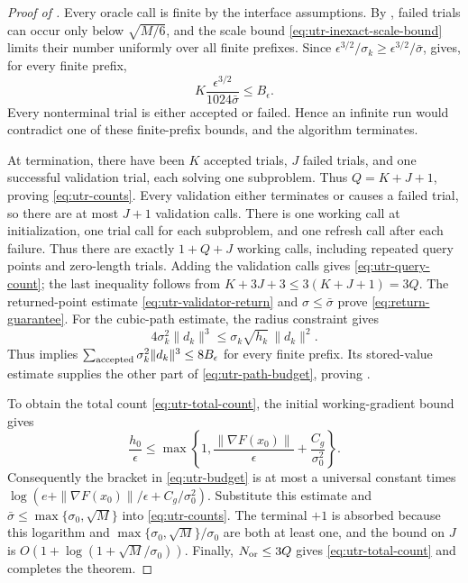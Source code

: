 \documentclass{article}
\begin{document}
\begin{proof}[Proof of ]
Every oracle call is finite by the interface assumptions.  By
, failed trials can occur only below
$\sqrt{M/6}$, and the scale bound
\eqref{eq:utr-inexact-scale-bound} limits their number uniformly
over all finite prefixes.  Since
$\epsilon^{3/2}/\sigma_k\ge\epsilon^{3/2}/\bar\sigma$,
gives, for every finite prefix,
\[
 K\frac{\epsilon^{3/2}}{1024\bar\sigma}\le B_\epsilon.
\]
Every nonterminal trial is either accepted or failed.  Hence an
infinite run would contradict one of these finite-prefix bounds,
and the algorithm terminates.

At termination, there have been $K$ accepted trials, $J$ failed
trials, and one successful validation trial, each solving one
subproblem.  Thus $Q=K+J+1$, proving \eqref{eq:utr-counts}.
Every validation either terminates or causes a failed trial, so
there are at most $J+1$ validation calls.
There is one working call at initialization, one trial call for each
subproblem, and one refresh call after each failure.  Thus there are
exactly $1+Q+J$ working calls, including repeated query points and
zero-length trials.  Adding the validation calls gives
\eqref{eq:utr-query-count}; the last inequality follows from
$K+3J+3\le3(K+J+1)=3Q$.
The returned-point estimate \eqref{eq:utr-validator-return} and
$\sigma\le\bar\sigma$ prove \eqref{eq:return-guarantee}.
For the cubic-path estimate, the radius constraint gives
\[
 4\sigma_k^2\|d_k\|^3
 \le\sigma_k\sqrt{h_k}\,\|d_k\|^2.
\]
Thus  implies
$\sum_{\rm accepted}\sigma_k^2\|d_k\|^3\le8B_\epsilon$ for every
finite prefix.  Its stored-value estimate supplies the other part
of \eqref{eq:utr-path-budget}, proving .

To obtain the total count \eqref{eq:utr-total-count}, the initial
working-gradient bound gives
\[
 \frac{h_0}{\epsilon}
 \le\max\left\{1,
       \frac{\|\nabla F(x_0)\|}{\epsilon}
          +\frac{C_g}{\sigma_0^2}\right\}.
\]
Consequently the bracket in \eqref{eq:utr-budget} is at most a
universal constant times
$\log(e+\|\nabla F(x_0)\|/\epsilon+C_g/\sigma_0^2)$.
Substitute this estimate and
$\bar\sigma\le\max\{\sigma_0,\sqrt M\}$ into
\eqref{eq:utr-counts}.  The terminal $+1$ is absorbed because this
logarithm and $\max\{\sigma_0,\sqrt M\}/\sigma_0$ are both at least
one, and the bound on $J$ is
$O(1+\log(1+\sqrt M/\sigma_0))$.
Finally, $N_{\rm or}\le3Q$ gives \eqref{eq:utr-total-count} and
completes the theorem.
\end{proof}
\end{document}
